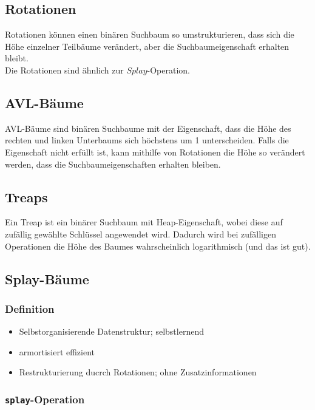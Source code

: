 \documentclass[11pt]{scrartcl}
\begin{document}
\subsection{Rotationen}
Rotationen können einen binären Suchbaum so umstrukturieren, dass sich die Höhe einzelner Teilbäume verändert, aber die Suchbaumeigenschaft erhalten bleibt. \\
Die Rotationen sind ähnlich zur $Splay$-Operation.

\subsection{AVL-Bäume}
AVL-Bäume sind binären Suchbaume mit der Eigenschaft, dass die Höhe des rechten und linken Unterbaums sich höchstens um 1 unterscheiden. Falls die Eigenschaft nicht erfüllt ist, kann mithilfe von Rotationen  die Höhe so verändert werden, dass die Suchbaumeigenschaften erhalten bleiben.

\subsection{Treaps}

Ein Treap ist ein binärer Suchbaum mit Heap-Eigenschaft, wobei diese auf zufällig gewählte Schlüssel angewendet wird. Dadurch wird bei zufälligen Operationen die Höhe des Baumes wahrscheinlich logarithmisch (und das ist gut).

\subsection{Splay-Bäume}

\subsubsection{Definition}
\begin{itemize}
	\item Selbstorganisierende Datenstruktur; selbstlernend
    \item armortisiert effizient
    \item Restrukturierung ducrch Rotationen; ohne Zusatzinformationen
\end{itemize}

\subsubsection{\texttt{splay}-Operation}
\end{document}
